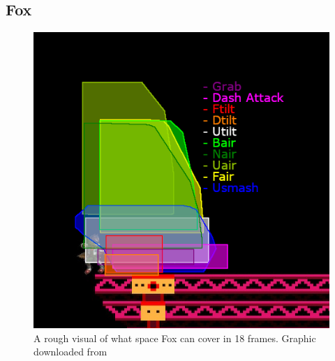 \subsection{Fox}

\begin{figure}[h]
    \centering
    \includegraphics[width=.4\textwidth]{images/threat-ranges/fox}
    \caption{A rough visual of what space Fox can cover in 18 frames. Graphic downloaded from\cite{ref:zovrah:threat-range:fox}}
\end{figure}

